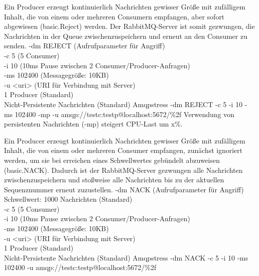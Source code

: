 \documentclass[	a4paper,
			11pt,
			titlepage,
			oneside,
			fleqn,
			listof=totoc,
			parskip,
			chapterprefix=false,
			numbers=noenddot]{scrreprt}
\begin{document}
\clearpage	
		{Ein Producer erzeugt kontinuierlich Nachrichten gewisser Größe mit zufälligem Inhalt, die von einem oder mehreren Consumern empfangen, aber sofort abgewiesen (basic.Reject) werden.%
		 Der RabbitMQ-Server ist somit gezwungen, die Nachrichten in der Queue zwischenzuspeichern und erneut an den Consumer zu senden.}%
		{%
		 -dm REJECT (Aufrufparameter für Angriff) \\
		 -c 5 (5 Consumer) \\
		 -i 10 (10ms Pause zwischen 2 Consumer/Producer-Anfragen) \\
		 -ms 102400 (Messagegröße: 10KB) \\
		 -u <uri> (URI für Verbindung mit Server) \\
		 1 Producer (Standard) \\
		 Nicht-Persistente Nachrichten (Standard)
		}%
		{Amqpstress -dm REJECT -c 5 -i 10 -ms 102400 -mp -u amqp://testc:testp@localhost:5672/\%2f}%
		{}%
		{Verwendung von persistenten Nachrichten (-mp) steigert CPU-Last um x\%.}
	
\clearpage	
		{Ein Producer erzeugt kontinuierlich Nachrichten gewisser Größe mit zufälligem Inhalt, die von einem oder mehreren Consumer empfangen, zunächst ignoriert werden, um sie bei erreichen eines Schwellwertes gebündelt abzuweisen (basic.NACK). Dadurch ist der RabbitMQ-Server gezwungen alle Nachrichten zwischenzuspeichern und stoßweise alle Nachrichten bis zu der aktuellen Sequenznummer erneut zuzustellen.}%
		{%
		 -dm NACK (Aufrufparameter für Angriff) \\
		 Schwellwert: 1000 Nachrichten (Standard) \\
		 -c 5 (5 Consumer) \\
		 -i 10 (10ms Pause zwischen 2 Consumer/Producer-Anfragen) \\
		 -ms 102400 (Messagegröße: 10KB) \\
		 -u <uri> (URI für Verbindung mit Server) \\
		 1 Producer (Standard) \\
		 Nicht-Persistente Nachrichten (Standard)
		}%
		{Amqpstress -dm NACK -c 5 -i 10 -ms 102400 -u amqp://testc:testp@localhost:5672/\%2f}%
		{}
		
\end{document}

